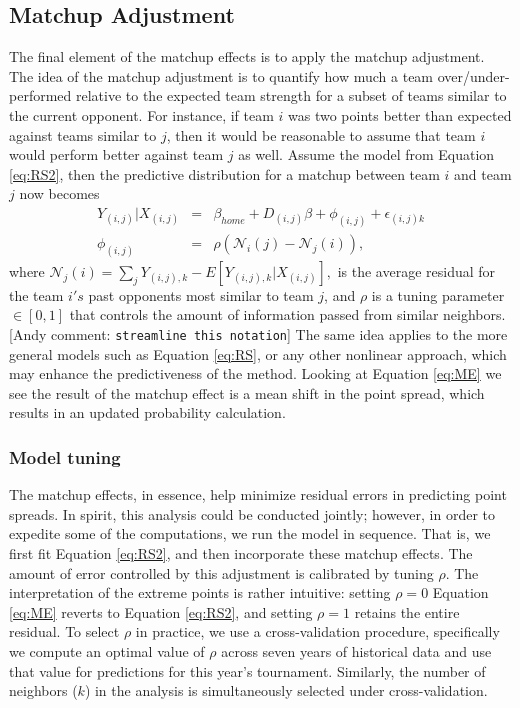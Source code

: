 \documentclass[letterpaper,12pt]{article}
\newcommand{\andyc}[1]{[{\color{red}\sc Andy comment: {\tt #1}}]}
\begin{document}
\subsection{Matchup Adjustment}
The final element of the matchup effects is to apply the matchup adjustment. The idea of the matchup adjustment is to quantify how much a team over/under-performed relative to the expected team strength for a subset of teams similar to the current opponent. For instance, if team $i$ was two points better than expected against teams similar to $j$, then it would be reasonable to assume that team $i$ would perform better against team $j$ as well.  Assume the model from Equation \ref{eq:RS2}, then the predictive distribution for a matchup between team $i$ and team $j$ now becomes
\begin{eqnarray}
Y_{(i,j)}|X_{(i,j)} &=& \beta_{home} +  D_{(i,j)}\beta + \phi_{(i,j)} +  \epsilon_{(i,j)k} \label{eq:ME}
\\
\nonumber
\phi_{(i,j)} &=& \rho(\mathcal{N}_i(j) -\mathcal{N}_j(i)),
\end{eqnarray}
where $\mathcal{N}_j(i) = \sum_j Y_{(i,j),k} - E[Y_{(i,j),k}|X_{(i,j)}],$ is the average residual for the team $i's$ past opponents most similar to team $j$, and $\rho$ is a tuning parameter $\in [0,1]$ that controls the amount of information passed from similar neighbors. \andyc{streamline this notation} The same idea applies to the more general models such as Equation \ref{eq:RS}, or any other nonlinear approach, which may enhance the predictiveness of the method. Looking at Equation \ref{eq:ME} we see the result of the matchup effect is a mean shift in the point spread, which results in an updated probability calculation.

\subsubsection{Model tuning\label{sec:tuning}}
The matchup effects, in essence, help minimize residual errors in predicting point spreads. In spirit, this analysis could be conducted jointly; however, in order to expedite some of the computations, we run the model in sequence. That is, we first fit Equation \ref{eq:RS2}, and then incorporate these matchup effects. The amount of error controlled by this adjustment is calibrated by tuning $\rho$. 
The interpretation of the extreme points is rather intuitive: setting $\rho = 0$ Equation \ref{eq:ME} reverts to Equation \ref{eq:RS2}, and setting $\rho = 1$ retains the entire residual. To select $\rho$ in practice, we use a cross-validation procedure, specifically we compute an optimal value of $\rho$ across seven years of historical data and use that value for predictions for this year's tournament. Similarly, the number of neighbors ($k$) in the analysis is simultaneously selected under cross-validation.
\end{document}
